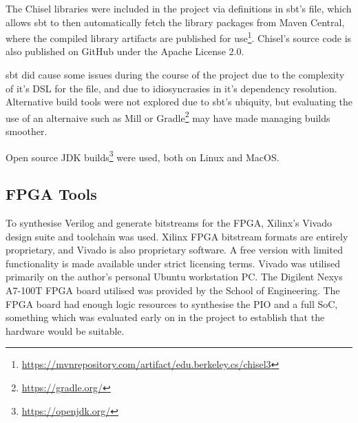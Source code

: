 The Chisel libraries were included in the project via definitions in sbt's  file, which allows sbt to then automatically fetch the library packages from Maven Central, where the compiled library artifacts are published for use\footnote{\url{https://mvnrepository.com/artifact/edu.berkeley.cs/chisel3}}. Chisel's source code is also published on GitHub under the Apache License 2.0.

sbt did cause some issues during the course of the project due to the complexity of it's DSL for the  file, and due to idiosyncrasies in it's dependency resolution. Alternative build tools were not explored due to sbt's ubiquity, but evaluating the use of an alternaive such as Mill \cite{Mill} or Gradle\footnote{\url{https://gradle.org/}} may have made managing builds smoother.

Open source JDK builds\footnote{\url{https://openjdk.org/}} were used, both on Linux and MacOS.

\subsection{FPGA Tools}

To synthesise Verilog and generate bitstreams for the FPGA, Xilinx's Vivado design suite and toolchain was used. Xilinx FPGA bitstream formats are entirely proprietary, and Vivado is also proprietary software. A free version with limited functionality is made available under strict licensing terms. Vivado was utilised primarily on the author's personal Ubuntu workstation PC. The Digilent Nexys A7-100T FPGA board utilised was provided by the School of Engineering. The FPGA board had enough logic resources to synthesise the PIO and a full SoC, something which was evaluated early on in the project to establish that the hardware would be suitable.

